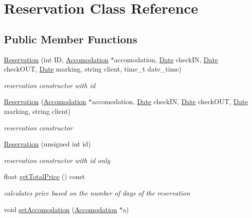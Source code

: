 \hypertarget{class_reservation}{}\section{Reservation Class Reference}
\label{class_reservation}
\subsection*{Public Member Functions}
\begin{DoxyCompactItemize}
\item 
\hyperlink{class_reservation_a467a8d7c95875dedefa0a165ba2d11bd}{Reservation} (int ID, \hyperlink{class_accomodation}{Accomodation} $\ast$accomodation, \hyperlink{class_date}{Date} check\+IN, \hyperlink{class_date}{Date} check\+O\+UT, \hyperlink{class_date}{Date} marking, string client, time\+\_\+t date\+\_\+time)
\begin{DoxyCompactList}\small\item\em reservation constructor with id \end{DoxyCompactList}\item 
\hyperlink{class_reservation_a79bb7fc9c32bbb5de4dcdcb14a4c4c42}{Reservation} (\hyperlink{class_accomodation}{Accomodation} $\ast$accomodation, \hyperlink{class_date}{Date} check\+IN, \hyperlink{class_date}{Date} check\+O\+UT, \hyperlink{class_date}{Date} marking, string client)
\begin{DoxyCompactList}\small\item\em reservation constructor \end{DoxyCompactList}\item 
\hyperlink{class_reservation_ad5e09723db6dd257c532d00d51aa9add}{Reservation} (unsigned int id)
\begin{DoxyCompactList}\small\item\em reservation constructor with id only \end{DoxyCompactList}\item 
\hypertarget{class_reservation_a31c13f5d56d55cfa7dd9de82160d48c5}{}\label{class_reservation_a31c13f5d56d55cfa7dd9de82160d48c5} 
float \hyperlink{class_reservation_a31c13f5d56d55cfa7dd9de82160d48c5}{get\+Total\+Price} () const
\begin{DoxyCompactList}\small\item\em calculates price based on the number of days of the reservation \end{DoxyCompactList}\item 
void \hyperlink{class_reservation_a17a9412b83e734b18692d007069e904e}{set\+Accomodation} (\hyperlink{class_accomodation}{Accomodation} $\ast$a)

\end{DoxyCompactItemize}
